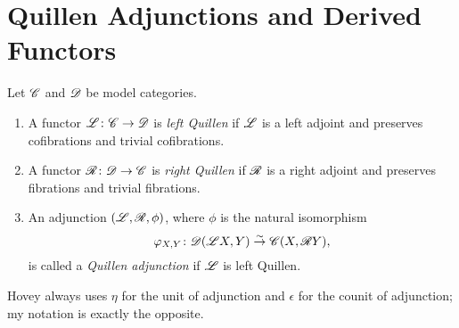 \documentclass[10pt]{amsart}
\begin{document}
\section{Quillen Adjunctions and Derived Functors}
\begin{defn}
  Let $\mathscr{C}$ and $\mathscr{D}$ be model categories.
  \begin{enumerate}
  \item
    A functor $\mathscr{L} \colon \mathscr{C} \to \mathscr{D}$ is {\it left Quillen} if $\mathscr{L}$ is a left adjoint and preserves cofibrations and trivial cofibrations.
  \item
    A functor $\mathscr{R} \colon \mathscr{D} \to \mathscr{C}$ is {\it right Quillen} if $\mathscr{R}$ is a right adjoint and preserves fibrations and trivial fibrations.
  \item
    An adjunction $(\mathscr{L}, \mathscr{R}, \phi)$, where $\phi$ is the natural isomorphism 
    $$\varphi_{X,Y} \colon \mathscr{D}(\mathscr{L} X, Y) \overset{\sim}\to \mathscr{C}(X, \mathscr{R} Y),$$
    is called a {\it Quillen adjunction} if $\mathscr{L}$ is left Quillen.
  \end{enumerate}
\end{defn}

\begin{rmk}
  Hovey always uses $\eta$ for the unit of adjunction and $\epsilon$ for the counit of adjunction; my notation is exactly the opposite.
\end{rmk}
\end{document}
